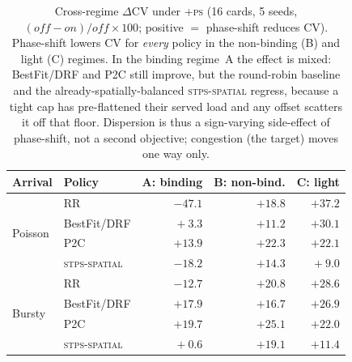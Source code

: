 \documentclass[letterpaper,twocolumn,10pt]{article}
\begin{document}
\begin{table}[t]
\centering
\caption{Cross-regime $\Delta$CV under \textsc{+ps} (16 cards, 5 seeds, $(off\!-\!on)/off \times 100$; positive $=$ phase-shift reduces CV). Phase-shift lowers CV for \emph{every} policy in the non-binding (B) and light (C) regimes. In the binding regime~A the effect is mixed: BestFit/DRF and P2C still improve, but the round-robin baseline and the already-spatially-balanced \textsc{stps-spatial} regress, because a tight cap has pre-flattened their served load and any offset scatters it off that floor. Dispersion is thus a sign-varying side-effect of phase-shift, not a second objective; congestion (the target) moves one way only.}
\label{tab:q2_regime_cv}
\small
\begin{tabular}{llrrr}
\toprule
Arrival & Policy & A: binding & B: non-bind. & C: light \\
\midrule
\multirow{4}{*}{Poisson} & RR        & $-47.1$ & $+18.8$ & $+37.2$ \\
                         & BestFit/DRF & $\phantom{0}+3.3$ & $+11.2$ & $+30.1$ \\
                         & P2C       & $+13.9$ & $+22.3$ & $+22.1$ \\
                         & \textsc{stps-spatial} & $-18.2$ & $+14.3$ & $\phantom{0}+9.0$ \\
\midrule
\multirow{4}{*}{Bursty}  & RR        & $-12.7$ & $+20.8$ & $+28.6$ \\
                         & BestFit/DRF & $+17.9$ & $+16.7$ & $+26.9$ \\
                         & P2C       & $+19.7$ & $+25.1$ & $+22.0$ \\
                         & \textsc{stps-spatial} & $\phantom{0}+0.6$ & $+19.1$ & $+11.4$ \\
\bottomrule
\end{tabular}
\end{table}
\end{document}

